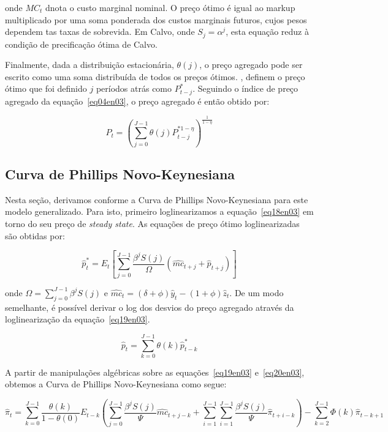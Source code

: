 \documentclass[twoside,a4paper,11pt]{report}
\begin{document}
\noindent onde ${MC}_{t}$ dnota o custo marginal nominal. O preço ótimo é igual ao markup multiplicado por uma soma ponderada dos custos marginais futuros, cujos pesos dependem tas taxas de sobrevida. Em Calvo, onde $S_{j}={\alpha}^{j}$, esta equação reduz à condição de precificação ótima de Calvo.

Finalmente, dada a distribuição estacionária, ${\theta}(j)$, o preço agregado pode ser escrito como uma soma distribuída de todos os preços ótimos. \citet{yao2010aggregate}, definem o preço ótimo que foi definido $j$ períodos atrás como $P_{t-j}^{*}$. Seguindo o índice de preço agregado da equação~\ref{eq04en03}, o preço agregado é então obtido por:

\begin{equation}\label{eq19en03}
{P}_{t}={(\sum_{j=0}^{J-1}{\theta(j){P}_{t-j}^{*1-\eta}})}^{\frac{1}{1-\eta}}
\end{equation}

\subsection*{Curva de Phillips Novo-Keynesiana}

Nesta seção, derivamos conforme \citet{yao2010aggregate} a Curva de Phillips Novo-Keynesiana para este modelo generalizado. Para isto, primeiro loglinearizamos a equação~\ref{eq18en03} em torno do seu preço de \emph{steady state}. As equações de preço ótimo loglinearizadas são obtidas por:

\begin{equation}\label{eq20en03}
{\hat{p}}_{t}^{*}={E}_{t}[\sum_{j=0}^{J-1}{\frac{{\beta}^{j}S(j)}{\Omega}}({\hat{mc}}_{t+j}+{\hat{p}}_{t+j})] 
\end{equation}

\noindent onde $\Omega=\sum_{j=0}^{J-1}{{\beta}^{j}S(j)}$ e ${\hat{mc}}_{t}=(\delta +\phi){\hat{y}}_{t}-(1+\phi){\hat{z}}_{t}$. De um modo semelhante, é possível derivar o log dos desvios do preço agregado através da loglinearização da equação~\ref{eq19en03}.

\begin{equation}\label{eq21en03}
{\hat{p}}_{t}=\sum_{k=0}^{J-1}{\theta(k){\hat{p}}_{t-k}^{*}} 
\end{equation}

A partir de manipulações algébricas sobre as equações~\ref{eq19en03} e~\ref{eq20en03}, obtemos a Curva de Phillips Novo-Keynesiana como segue:

\begin{equation}\label{eq22en03}
{\hat{\pi}}_{t}=\sum_{k=0}^{J-1}{\frac{\theta(k)}{1-\theta(0)}{E}_{t-k}(\sum_{j=0}^{J-1}{\frac{{\beta}^{j}S(j)}{\Psi}{\hat{mc}}_{t+j-k}+\sum_{i=1}^{J-1}{\sum_{i=1}^{J-1}{\frac{{\beta}^{j}S(j)}{\Psi}}}{\hat{\pi}}_{t+i-k}})-\sum_{k=2}^{J-1}{\Phi(k){\hat{\pi}}_{t-k+1}}} 
\end{equation}
\end{document}
